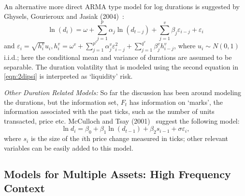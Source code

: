 An alternative more direct ARMA type model for log durations is suggested by Ghysels, Gourieroux and Jasiak (2004)~\cite{jasiak}:
        \begin{equation} \label{eqn:21lnd}
        	\ln{(d_i)} = \omega + \sum_{j=1}^p \alpha_j \ln{(d_{t-j})} + \sum_{j=1}^v \beta_j \varepsilon_{i-j} + \varepsilon_i
        \end{equation}
and $\varepsilon_i = \sqrt{h_i^v} u_i, h_i^v = \omega^v + \sum_{j=1}^{p^v} \alpha_j^v \varepsilon_{i-j}^2 + \sum_{j=1}^{q^v} \beta_j^v h_{i-j}^v$, where $u_i \sim N(0,1)$ i.i.d.; here the conditional mean and variance of durations are assumed to be separable. The duration volatility that is modeled using the second equation in \eqref{eqn:2dipsi} is interpreted as `liquidity' risk. \twomedskip


\noindent \emph{Other Duration Related Models:} So far the discussion has been around modeling the durations, but the information set, $F_t$ has information on `marks', the information associated with the past ticks, such as the number of units transacted, price etc. McCulloch and Tsay (2001)~\cite{mccullochtsay07} suggest the following model:
	\begin{equation} \label{eqn:2lndi}
	\ln{d_i} = \beta_0 + \beta_1 \ln{(d_{t-1})} + \beta_2s_{i-1} + \sigma\varepsilon_i,
	\end{equation}
where $s_i$ is the size of the $i$th price change measured in ticks; other relevant variables can be easily added to this model. \label{in:style8}



\subsection{Models for Multiple Assets: High Frequency Context}


